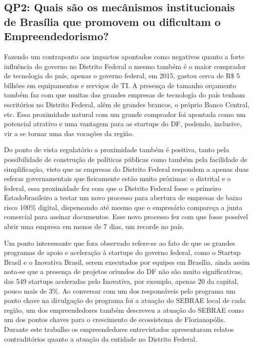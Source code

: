 \subsection{QP2: Quais são os mecânismos institucionais de Brasília que promovem ou dificultam o Empreendedorismo?}
\label{subsection:pergunta_de_pesquisa_2}

Fazendo um contraponto aos impactos apontados como negativos quanto a forte influência do governo no Distrito Federal o mesmo também é o maior comprador de tecnologia do país, apenas o governo federal, em 2015, gastou cerca de R\$ 5 bilhões em equipamentos e serviços de TI. A presença de tamanho orçamento também faz com que muitas das grandes empresas de tecnologia do país tenham escritórios no Distrito Federal, além de grandes brancos, o próprio Banco Central, etc. Essa proximidade natural com um grande comprador foi apontada como um potencial atrativo e uma vantagem para as startups do DF, podendo, inclusive, vir a se tornar uma das vocações da região.

Do ponto de vista regulatório a proximidade também é positiva, tanto pela possibilidade de construção de políticas públicas como também pela facilidade de simplificação, visto que as empresas do Distrito Federal respondem a apenas duas esferas governamentais que fisicamente estão muito próximas: o  distrital e o federal, essa proximidade fez com que o Distrito Federal fosse o primeiro \"Estado\" brasileiro a testar um novo processo para abertura de empresas de baixo risco 100\% digital, dispensando até mesmo que o empresário compareça a junta comercial para assinar documentos. Esse novo processo fez com que fosse possível abrir uma empresa em menos de 7 dias, um recorde no país.

Um ponto interessante que fora observado refere-se ao fato de que os grandes programas de apoio e aceleração à startups do governo federal, como o Startup Brasil e o Inovativa Brasil, serem executados por equipes em Brasília, ainda assim nota-se que a presença de projetos oriundos do DF não são muito significativas, das 549 startups aceleradas pelo Inovativa, por exemplo, apenas 20 da capital, pouco mais de 3\%. Ao conversar com um dos responsáveis pelo programa um ponto chave na divulgação do programa foi a atuação do SEBRAE local de cada região, um dos empreendedores também descreveu a atuação do SEBRAE como um dos pontos chaves para o crescimento de ecossistema de Florianopólis. Durante este trabalho os empreendedores entrevistados apresentaram relatos contraditórios quanto a atuação da entidade no Distrito Federal.

